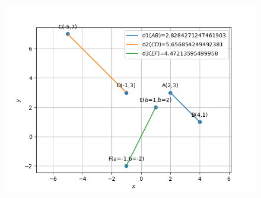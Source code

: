 \documentclass[12pt]{article}
\begin{document}
\begin{enumerate}
\begin{figure}[!h]
	\begin{center} 
	    \includegraphics[width=\columnwidth]{./figs/graph.png}
	\end{center}
\caption{}
\label{fig:Fig}
\end{figure}
\end{enumerate}
\end{document}
